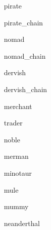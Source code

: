 \documentclass[letterpaper,serif]{module}
\begin{document}
\begin{newmonster}{pirate}\end{newmonster}

\begin{newmonster}{pirate_chain}\end{newmonster}

\begin{newmonster}{nomad}\end{newmonster}

\begin{newmonster}{nomad_chain}\end{newmonster}

\begin{newmonster}{dervish}\end{newmonster}

\begin{newmonster}{dervish_chain}\end{newmonster}

\begin{newmonster}{merchant}\end{newmonster}

\begin{newmonster}{trader}\end{newmonster}

\begin{newmonster}{noble}\end{newmonster}

\begin{newmonster}{merman}\end{newmonster}

\begin{newmonster}{minotaur}\end{newmonster}

\begin{newmonster}{mule}\end{newmonster}

\begin{newmonster}{mummy}\end{newmonster}

\begin{newmonster}{neanderthal}\end{newmonster}
\end{document}
